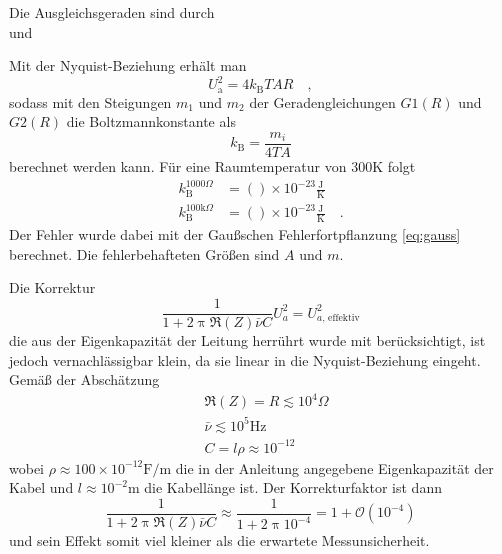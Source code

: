 		Die Ausgleichsgeraden sind durch
		\begin{equation}
			
		\end{equation}
		und
		\begin{equation}
			
		\end{equation}

		Mit der Nyquist-Beziehung erhält man
		\begin{equation}
			U_\text{a}^2 =4k_\text{B}T A R \quad ,
		\end{equation}
		sodass mit den Steigungen $m_1$ und $m_2$ der Geradengleichungen $G1(R)$ und $G2(R)$
		die Boltzmannkonstante als
		\begin{equation}
		k_\text{B}=\frac{m_i}{4 T A}
		\end{equation}
		berechnet werden kann. Für eine Raumtemperatur von $300$K folgt
		\begin{align}
          k_\text{B}^{1000\Omega}			&=  ()\times 10^{-23}\frac{\text{J}}
																			{\text{K}}  \\
                                                                            k_\text{B}^{100\text{k}\Omega}	&=  ()\times 10^{-23}\frac{\text{J}}
																			{\text{K}} \quad .
		\end{align}
		Der Fehler wurde dabei mit der Gaußschen Fehlerfortpflanzung \eqref{eq:gauss}
		berechnet. Die fehlerbehafteten Größen sind $A$ und $m$.

		Die Korrektur
		\begin{equation}
		\frac{1}{1+2 \uppi \Re(Z) \bar{\nu} C} U_a^2 = U_{a\text{, effektiv}}^2
		\end{equation}
		die aus der Eigenkapazität der Leitung herrührt wurde mit berücksichtigt, ist
		jedoch vernachlässigbar klein, da
		sie linear in die Nyquist-Beziehung eingeht. Gemäß der Abschätzung
		\begin{align}
		&\Re(Z) = R  \lesssim  10^4 \Omega \\
		&\bar{\nu}  \lesssim 10^5 \text{Hz} \\
		&C = l \rho  \approx 10^{-12}
		\end{align}
		wobei $\rho\approx 100 \times 10^{-12} \text{F}/\text{m}$ die in
		der Anleitung angegebene Eigenkapazität der Kabel
		und $l\approx 10^{-2}$m die Kabellänge ist. Der Korrekturfaktor ist dann
		\begin{equation}
		\frac{1}{1+2 \uppi \Re(Z) \bar{\nu} C} \approx
		\frac{1}{1+2\uppi 10^{-4}}=1+ \mathcal{O}(10^{-4})
		\end{equation}
		und sein Effekt somit viel kleiner als die erwartete Messunsicherheit.

